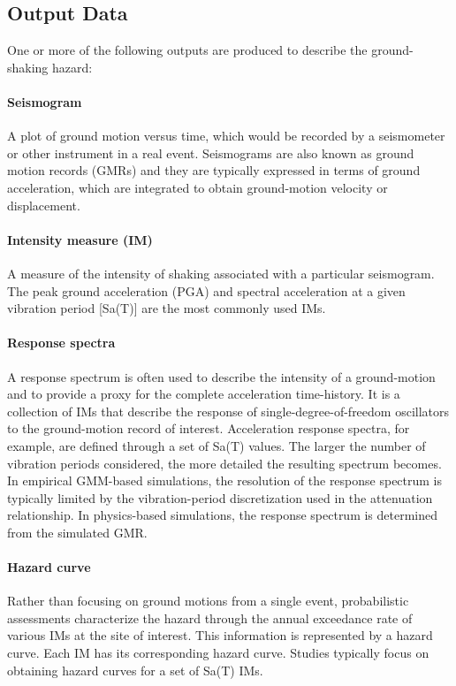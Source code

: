 \subsection{Output Data}

\noindent One or more of the following outputs are produced to describe the ground-shaking hazard:

\paragraph{Seismogram} A plot of ground motion versus time, which would be recorded by a seismometer or other instrument in a real event. Seismograms are also known as ground motion records (GMRs) and they are typically expressed in terms of ground acceleration, which are integrated to obtain ground-motion velocity or displacement.  

\paragraph{Intensity measure (IM)} A measure of the intensity of shaking associated with a particular seismogram. The peak ground acceleration (PGA) and spectral acceleration at a given vibration period [Sa(T)] are the most commonly used IMs.

\paragraph{Response spectra} A response spectrum is often used to describe the intensity of a ground-motion and to provide a proxy for the complete acceleration time-history. It is a collection of IMs that describe the response of single-degree-of-freedom oscillators to the ground-motion record of interest. Acceleration response spectra, for example, are defined through a set of Sa(T) values. The larger the number of vibration periods considered, the more detailed the resulting spectrum becomes. In empirical GMM-based simulations, the resolution of the response spectrum is typically limited by the vibration-period discretization used in the attenuation relationship. In physics-based simulations, the response spectrum is determined from the simulated GMR.

\paragraph{Hazard curve} Rather than focusing on ground motions from a single event, probabilistic assessments characterize the hazard through the annual exceedance rate of various IMs at the site of interest. This information is represented by a hazard curve. Each IM has its corresponding hazard curve. Studies typically focus on obtaining hazard curves for a set of Sa(T) IMs. 

